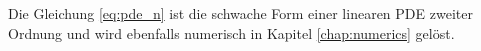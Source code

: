 \documentclass{mythesis}
\begin{document}
Die Gleichung \ref{eq:pde_n} ist die schwache Form einer linearen PDE zweiter Ordnung und wird ebenfalls numerisch in Kapitel \ref{chap:numerics} gelöst.












%
%
\end{document}
